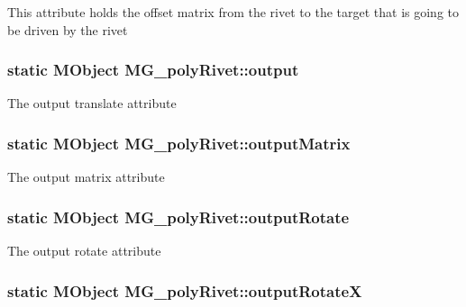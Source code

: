 This attribute holds the offset matrix from the rivet to the target that is going to be driven by the rivet \hypertarget{class_m_g__poly_rivet_a3e4254e0cca1ba2be5fcbac82c9c5c12}{
\subsubsection[{output}]{\setlength{\rightskip}{0pt plus 5cm}static M\-Object M\-G\-\_\-poly\-Rivet\-::output\hspace{0.3cm}{\ttfamily [static]}}}\label{class_m_g__poly_rivet_a3e4254e0cca1ba2be5fcbac82c9c5c12}
The output translate attribute \hypertarget{class_m_g__poly_rivet_a66a9ea9bb7e75ba0c7bc1644dbbc481d}{
\subsubsection[{output\-Matrix}]{\setlength{\rightskip}{0pt plus 5cm}static M\-Object M\-G\-\_\-poly\-Rivet\-::output\-Matrix\hspace{0.3cm}{\ttfamily [static]}}}\label{class_m_g__poly_rivet_a66a9ea9bb7e75ba0c7bc1644dbbc481d}
The output matrix attribute \hypertarget{class_m_g__poly_rivet_a258f5cda9a54d7c22b45c70c17852ffc}{
\subsubsection[{output\-Rotate}]{\setlength{\rightskip}{0pt plus 5cm}static M\-Object M\-G\-\_\-poly\-Rivet\-::output\-Rotate\hspace{0.3cm}{\ttfamily [static]}}}\label{class_m_g__poly_rivet_a258f5cda9a54d7c22b45c70c17852ffc}
The output rotate attribute \hypertarget{class_m_g__poly_rivet_a56e48fc9050adcabb9554e520335e6ab}{
\subsubsection[{output\-Rotate\-X}]{\setlength{\rightskip}{0pt plus 5cm}static M\-Object M\-G\-\_\-poly\-Rivet\-::output\-Rotate\-X\hspace{0.3cm}{\ttfamily [static]}}}\label{class_m_g__poly_rivet_a56e48fc9050adcabb9554e520335e6ab}
